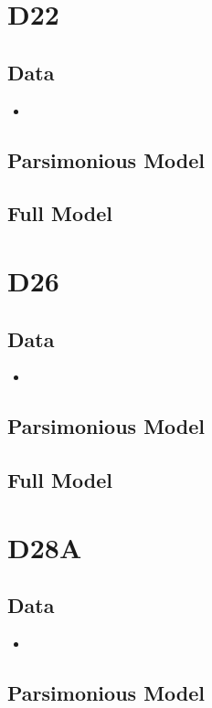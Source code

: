\documentclass[12pt]{amsart}
\begin{document}
\section{D22}
\subsection{Data}
\begin{itemize}
\item 
\end{itemize}
\subsection{Parsimonious Model}

\subsection{Full Model}

\section{D26}
\subsection{Data}
\begin{itemize}
\item
\end{itemize}
\subsection{Parsimonious Model}

\subsection{Full Model}

\section{D28A}
\subsection{Data}
\begin{itemize}
\item
\end{itemize}
\subsection{Parsimonious Model}
\end{document}
